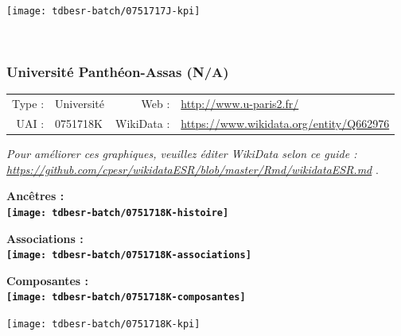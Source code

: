 \documentclass[12pt,french,]{article}
\begin{document}
\begin{center}\texttt{[image: tdbesr-batch/0751717J-kpi]} \end{center}\checkoddpage

\ifoddpage \fi ~\newpage  

\hypertarget{universituxe9-panthuxe9on-assas-na}{%
\subsubsection{Université Panthéon-Assas
(N/A)}\label{universituxe9-panthuxe9on-assas-na}}

\begin{tabular*}{\textwidth}{rp{5cm}rl}  
\hline  
Type : & Université & Web : &\href{http://www.u-paris2.fr/}{http://www.u-paris2.fr/} \\  
UAI : & 0751718K & WikiData : & \href{https://www.wikidata.org/entity/Q662976}{https://www.wikidata.org/entity/Q662976} \\  
\hline  
\end{tabular*}

\textit{\scriptsize Pour améliorer ces graphiques, veuillez éditer WikiData selon ce guide :  \href{https://github.com/cpesr/wikidataESR/blob/master/Rmd/wikidataESR.md}{https://github.com/cpesr/wikidataESR/blob/master/Rmd/wikidataESR.md}}
.

\vspace{1cm}  
\begin{minipage}[b]{0.50\textwidth}\begin{center} \bf Ancêtres : \\  
\texttt{[image: tdbesr-batch/0751718K-histoire]} \end{center}\end{minipage}\begin{minipage}[b]{0.50\textwidth}\begin{center} \bf Associations : \\  
\texttt{[image: tdbesr-batch/0751718K-associations]} \end{center}\end{minipage}

\hrulefill

\begin{center} \bf Composantes : \\  
\texttt{[image: tdbesr-batch/0751718K-composantes]} \end{center}

\begin{center}\texttt{[image: tdbesr-batch/0751718K-kpi]} \end{center}\checkoddpage
\end{document}
